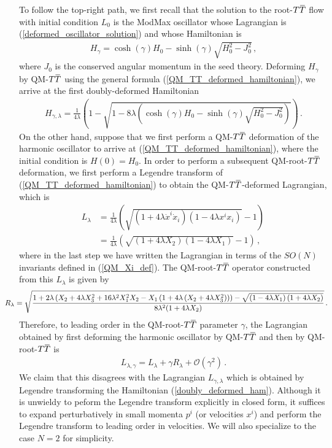 \documentclass[12pt]{article}
\numberwithin{equation}{section}
\newcommand{\overbar}[1]{\mkern 1.5mu\overline{\mkern-1.5mu#1\mkern-1.5mu}\mkern 1.5mu}
\def\TT{{T\overbar{T}}}
\begin{document}
To follow the top-right path, we first recall that the solution to the root-$\TT$ flow with initial condition $L_0$ is the ModMax oscillator whose Lagrangian is (\ref{deformed_oscillator_solution}) and whose Hamiltonian is
%
\begin{align}\label{first_step_rTT_ham}
    H_\gamma = \cosh ( \gamma ) H_0 - \sinh ( \gamma ) \sqrt{ H_0^2 - J_0^2 } \, ,
\end{align}
%
where $J_0$ is the conserved angular momentum in the seed theory. Deforming $H_\gamma$ by QM-$\TT$ using the general formula (\ref{QM_TT_deformed_hamiltonian}), we arrive at the first doubly-deformed Hamiltonian
%
\begin{align}\label{doubly_deformed_ham}
    H_{\gamma, \lambda} = \frac{1}{4 \lambda} \left( 1 - \sqrt{ 1 - 8 \lambda \left( \cosh ( \gamma ) H_0 - \sinh ( \gamma ) \sqrt{ H_0^2 - J_0^2 } \right) } \right) \, .
\end{align}
%
On the other hand, suppose that we first perform a QM-$\TT$ deformation of the harmonic oscillator to arrive at (\ref{QM_TT_deformed_hamiltonian}), where the initial condition is $H ( 0 ) = H_0$. In order to perform a subsequent QM-root-$\TT$ deformation, we first perform a Legendre transform of (\ref{QM_TT_deformed_hamiltonian}) to obtain the QM-$\TT$-deformed Lagrangian, which is
%
\begin{align}\label{TT-deformed-sho-lagrangian}
    L_\lambda &= \frac{1}{4 \lambda} \left( \sqrt{ \left( 1 + 4 \lambda \dot{x}^i \dot{x}_i \right) \left( 1 - 4 \lambda x^i x_i \right) } - 1  \right)  \, \nonumber \\
    &= \frac{1}{4 \lambda} \left( \sqrt{ \left( 1 + 4 \lambda X_2 \right) \left( 1 - 4 \lambda X_1 \right) } - 1  \right) \, ,
\end{align}
%
where in the last step we have written the Lagrangian in terms of the $SO(N)$ invariants defined in (\ref{QM_Xi_def}). The QM-root-$\TT$ operator constructed from this $L_\lambda$ is given by
%
\begin{align}\hspace{-20pt}
    R_\lambda = \sqrt{ \frac{1 + 2 \lambda \left( X_2 + 4 \lambda X_3^2 + 16 \lambda^2 X_1^2 X_2 - X_1 \left( 1 + 4 \lambda \left( X_2 + 4 \lambda X_3^2 \right) \right) \right) - \sqrt{ \left( 1 - 4 \lambda X_1 \right) \left( 1 + 4 \lambda X_2 \right) }}{8 \lambda^2 ( 1 + 4 \lambda X_2 )} } \, .
\end{align}
%
Therefore, to leading order in the QM-root-$\TT$ parameter $\gamma$, the Lagrangian obtained by first deforming the harmonic oscillator by QM-$\TT$ and then by QM-root-$\TT$ is 
%
\begin{align}\label{commute_L_lambda_gamma}
    L_{\lambda, \gamma} = L_\lambda + \gamma R_\lambda + \mathcal{O} ( \gamma^2 ) \, .
\end{align}
%
We claim that this disagrees with the Lagrangian $L_{\gamma, \lambda}$ which is obtained by Legendre transforming the Hamiltonian (\ref{doubly_deformed_ham}). Although it is unwieldy to peform the Legendre transform explicitly in closed form, it suffices to expand perturbatively in small momenta $p^i$ (or velocities $x^i$) and perform the Legendre transform to leading order in velocities. We will also specialize to the case $N = 2$ for simplicity.
\end{document}

